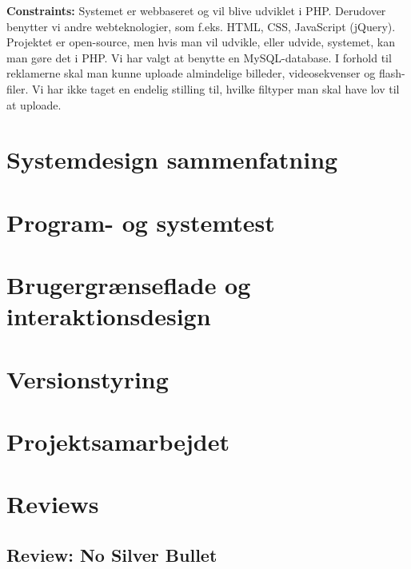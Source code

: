 \documentclass[a4paper,12pt]{article}
\begin{document}
\textbf{Constraints:} Systemet er webbaseret og vil blive udviklet i PHP. Derudover benytter vi andre webteknologier, som f.eks. HTML, CSS, JavaScript (jQuery). Projektet er open-source, men hvis man vil udvikle, eller udvide, systemet, kan man gøre det i PHP. Vi har valgt at benytte en MySQL-database. I forhold til reklamerne skal man kunne uploade almindelige billeder, videosekvenser og flash-filer. Vi har ikke taget en endelig stilling til, hvilke filtyper man skal have lov til at uploade.

\section{Systemdesign sammenfatning}

\section{Program- og systemtest}

\section{Brugergrænseflade og interaktionsdesign}

\section{Versionstyring}

\section{Projektsamarbejdet}

\section{Reviews}
\subsection{Review: No Silver Bullet}
\end{document}
